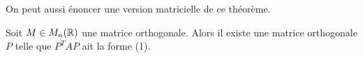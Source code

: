 On peut aussi énoncer une version matricielle de ce théorème.

\begin{thm}
Soit $M \in M_n(\mathbb{R})$ une matrice orthogonale. Alors il existe une matrice orthogonale $P$ telle que $P^{T}AP$ ait la forme (1).
\end{thm}

